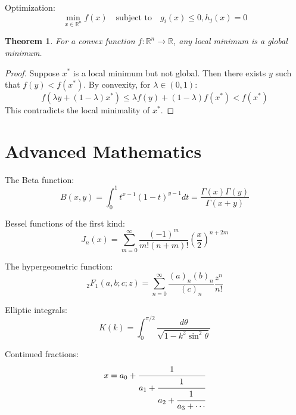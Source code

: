 \documentclass[11pt]{article}
\newtheorem{theorem}{Theorem}
\begin{document}
Optimization:
$$\min_{x \in \mathbb{R}^n} f(x) \quad \text{subject to} \quad g_i(x) \leq 0, h_j(x) = 0$$

\begin{theorem}
For a convex function $f: \mathbb{R}^n \to \mathbb{R}$, any local minimum is a global minimum.
\end{theorem}

\begin{proof}
Suppose $x^*$ is a local minimum but not global. Then there exists $y$ such that $f(y) < f(x^*)$. By convexity, for $\lambda \in (0,1)$:
$$f(\lambda y + (1-\lambda)x^*) \leq \lambda f(y) + (1-\lambda)f(x^*) < f(x^*)$$
This contradicts the local minimality of $x^*$.
\end{proof}

\section{Advanced Mathematics}

The Beta function:
$$B(x,y) = \int_0^1 t^{x-1}(1-t)^{y-1} dt = \frac{\Gamma(x)\Gamma(y)}{\Gamma(x+y)}$$

Bessel functions of the first kind:
$$J_n(x) = \sum_{m=0}^{\infty} \frac{(-1)^m}{m!(n+m)!} \left(\frac{x}{2}\right)^{n+2m}$$

The hypergeometric function:
$$_2F_1(a,b;c;z) = \sum_{n=0}^{\infty} \frac{(a)_n(b)_n}{(c)_n} \frac{z^n}{n!}$$

Elliptic integrals:
$$K(k) = \int_0^{\pi/2} \frac{d\theta}{\sqrt{1-k^2\sin^2\theta}}$$

Continued fractions:
$$x = a_0 + \cfrac{1}{a_1 + \cfrac{1}{a_2 + \cfrac{1}{a_3 + \cdots}}}$$
\end{document}
